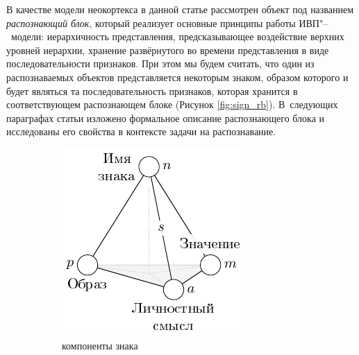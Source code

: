 \documentclass[a4paper, 12pt]{article}
\theoremstyle{plain}
\begin{document}
	В качестве модели неокортекса в данной статье рассмотрен объект под названием \textit{распознающий блок}, который реализует основные принципы работы ИВП"--~модели: иерархичность представления, предсказывающее воздействие верхних уровней иерархии, хранение развёрнутого во времени представления в виде последовательности признаков. При этом мы будем считать, что один из распознаваемых объектов представляется некоторым знаком, образом которого и будет являться та последовательность признаков, которая хранится в соответствующем распознающем блоке (Рисунок \ref{fig:sign_rb}). В~следующих параграфах статьи изложено формальное описание распознающего блока и исследованы его свойства в контексте задачи на распознавание.
	\begin{figure}
		\centering
		\begin{subfigure}[b]{0.4\textwidth}
			\includegraphics[width=\linewidth]{sign}
			\caption{компоненты знака}
			\label{fig:sign}
		\end{subfigure}
		\qquad
		\begin{subfigure}[b]{0.5\textwidth}

\end{subfigure}
\end{figure}
\end{document}
